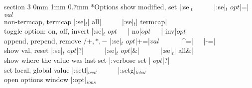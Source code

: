 \documentclass[10pt,a4paper,landscape]{article}
\makeatletter
\renewcommand{\section}{\@startsection		%
	{section}
	{3}
	{0mm}
	{1mm}
	{0.7mm}
	{\normalfont\bfseries\footnotesize}}
\newcommand{\opt}[1]{$_{#1}$}
\newcommand{\w}{{~~~}}
\makeatother
\begin{document}
\begin{multicols}{4}
\section*{Options}
show modified, set	    \dotfill|:se|\opt{t}\w\w|:se|\opt{t} $opt$|=|$val$\\
non-termcap, termcap	    \dotfill|:se|\opt{t}| all|\w\w|:se|\opt{t}| termcap|\\
toggle option: on, off, invert	\dotfill|:se|\opt{t} $opt$\w| no|$opt$\w| inv|$opt$\\
append, prepend, remove /$+,*,-$    \dotfill|:se|\opt{t} $opt$|+=|$val$\w\w|^=|\w|-=|\\
show val, reset		    \dotfill|:se|\opt{t} $opt$|?|\w\w|:se|\opt{t} $opt$|&|\w\w|:se|\opt{t}| all&|\\
show where the value was last set	\dotfill|:verbose set | $opt$|?|\\
set local, global value	    \dotfill|:setl|\opt{ocal}\w\w|:setg|\opt{lobal}\\
open options window	    \dotfill|:opt|\opt{ions}

\end{multicols}
\end{document}
